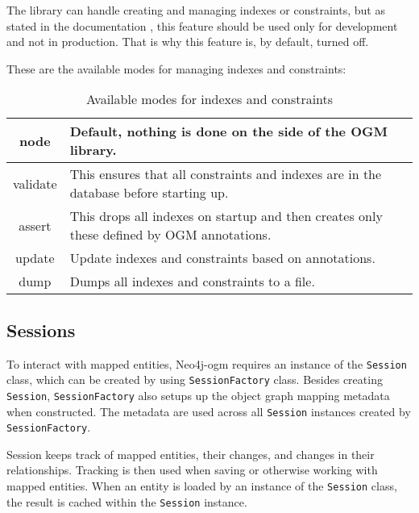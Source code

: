 The library can handle creating and managing indexes or constraints, but as stated in the documentation \cite{noauthor_reference_nodate}, this feature should be used only for development and not in production. That is why this feature is, by default, turned off.

These are the available modes for managing indexes and constraints:
\begin{table}[H]
    \begin{center}
        \begin{tabularx}{\textwidth}{|c|p{}|}
            \hline
            node     & Default, nothing is done on the side of the OGM library.                                  \\
            \hline
            validate & This ensures that all constraints and indexes are in the database before starting up.     \\
            \hline
            assert   & This drops all indexes on startup and then creates only these defined by OGM annotations. \\
            \hline
            update   & Update indexes and constraints based on annotations.                                      \\
            \hline
            dump     & Dumps all indexes and constraints to a file.                                              \\
            \hline
        \end{tabularx}
        \caption{Available modes for indexes and constraints}
    \end{center}
\end{table}

\subsection{Sessions}
To interact with mapped entities, Neo4j-\acrshort{ogm} requires an instance of the \texttt{Session} class, which can be created by using \texttt{SessionFactory} class.
Besides creating \texttt{Session}, \texttt{SessionFactory} also setups up the object graph mapping metadata when constructed.
The metadata are used across all \texttt{Session} instances created by \texttt{SessionFactory}.

Session keeps track of mapped entities, their changes, and changes in their relationships.
Tracking is then used when saving or otherwise working with mapped entities.
When an entity is loaded by an instance of the \texttt{Session} class, the result is cached within the \texttt{Session} instance.

